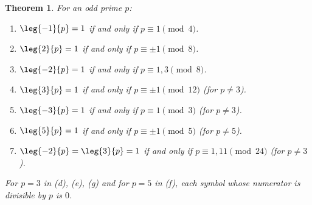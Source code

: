 \documentclass[11pt]{article}
\theoremstyle{ntstyle}
\newtheorem{theorem}{Theorem}[subsection]
\begin{document}
\begin{theorem}\label{thm:7.5.2} For an odd prime $p$:

	\begin{enumerate}[label={\alph*)}]
		\item $\leg{-1}{p} = 1$ if and only if $p \equiv 1 \pmod{4}$.
		\item $\leg{2}{p} = 1$ if and only if $p \equiv \pm 1 \pmod{8}$.
		\item $\leg{-2}{p} = 1$ if and only if $p \equiv 1, 3 \pmod{8}$.
		\item $\leg{3}{p} = 1$ if and only if $p \equiv \pm 1
			      \pmod{12}$ (for $p \neq 3$).
		\item $\leg{-3}{p} = 1$ if and only if $p \equiv 1 \pmod{3}$
		      (for $p \neq 3$).
		\item $\leg{5}{p} = 1$ if and only if $p \equiv \pm 1 \pmod{5}$ (for $p \neq
			      5$).
		\item $\leg{-2}{p} = \leg{3}{p} = 1$
			      if and only if $p \equiv 1, 11 \pmod{24}$ (for $p \neq 3$).
	\end{enumerate}

	For $p = 3$ in (d), (e), (g) and for $p = 5$ in (f), each symbol whose
	numerator is divisible by $p$ is $0$.

\end{theorem}
\end{document}
